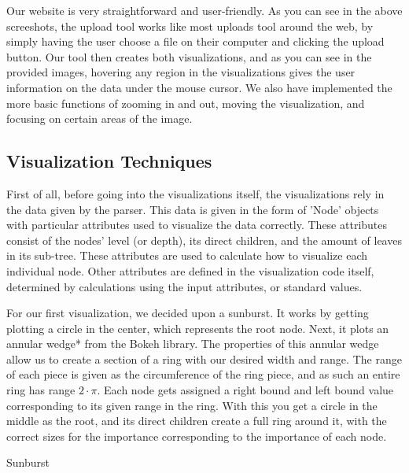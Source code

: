 \documentclass[journal, 9pt]{vgtc}                %
\begin{document}

Our website is very straightforward and user-friendly. As you can see in the above screeshots, the upload tool works like most uploads tool around the web, by simply having the
user choose a file on their computer and clicking the upload button. Our tool then creates both visualizations, and as you can see in the provided images, hovering any region in the
visualizations gives the user information on the data under the mouse cursor. We also have implemented the more basic functions of zooming in and out, moving the visualization,
and focusing on certain areas of the image.

\subsection{Visualization Techniques}

First of all, before going into the visualizations itself, the visualizations rely in the data given by the parser. This data is given in the form of 'Node' objects with particular attributes used to visualize
the data correctly. These attributes consist of the nodes' level (or depth), its direct children, and the amount of leaves in its sub-tree. These attributes are used to calculate how to visualize each individual node. Other attributes are defined in the visualization code itself, determined by calculations using the input attributes, or standard values.

\vspace{5mm}

For our first visualization, we decided upon a sunburst. It works by getting plotting a circle in the center, which represents the root node.
Next, it plots an annular wedge* from the Bokeh library. The properties of this annular wedge allow us to create a section of a ring with our desired width and range.
The range of each piece is given as the circumference of the ring piece, and as such an entire ring has range $2 \cdot \pi$. Each node gets assigned a right bound and left bound value corresponding to its given range in the ring.
With this you get a circle in the middle as the root, and its direct children create a full ring around it, with the correct sizes for the importance corresponding to the importance of each node.

\begin{algorithm}
\caption{Sunburst}
\begin{algorithmic}[1]
\EndFor
\Else{}
\EndIf
{}
\EndIf
{}
\EndFor
\EndIf
\end{algorithmic}
\end{algorithm}
\end{document}
